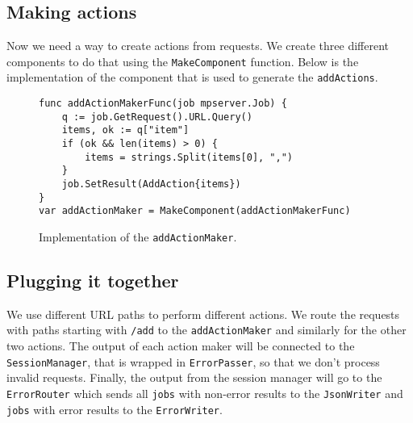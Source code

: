 \subsection{Making actions}
Now we need a way to create actions from requests. We create three different
components to do that using the \texttt{MakeComponent} function. Below
is the implementation of the component that is used to generate 
the \texttt{addActions}.
\begin{figure}[h]
\begin{lstlisting}
func addActionMakerFunc(job mpserver.Job) {
    q := job.GetRequest().URL.Query()
    items, ok := q["item"]
    if (ok && len(items) > 0) {
        items = strings.Split(items[0], ",")
    }
    job.SetResult(AddAction{items})
}
var addActionMaker = MakeComponent(addActionMakerFunc) 
\end{lstlisting}
\caption[scale=1.0]{Implementation of the \texttt{addActionMaker}.}
\label{fig:addActionMaker}
\end{figure}

\subsection{Plugging it together}
We use different URL paths to perform different actions. We route the 
requests with paths starting with \texttt{/add} to the \texttt{addActionMaker}
and similarly for the other two actions. The output of each action maker
will be connected to the \texttt{SessionManager}, that is wrapped in
\texttt{ErrorPasser}, so that we don't process invalid requests.
Finally, the output from the session manager will go to the \texttt{ErrorRouter}
which sends all \texttt{jobs} with non-error results to the 
\texttt{JsonWriter} and \texttt{jobs} with error results to the 
\texttt{ErrorWriter}. 

